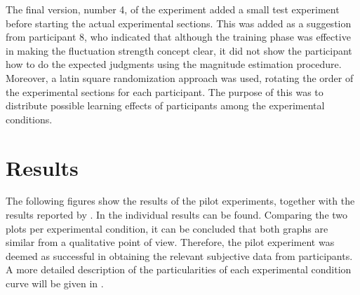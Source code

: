 \documentclass[../main.tex]{subfiles}
\begin{document}
The final version, number 4, of the experiment added a small test experiment
before starting the actual experimental sections. This was added as a suggestion
from participant 8, who indicated that although the training phase was effective
in making the fluctuation strength concept clear, it did not show the
participant how to do the expected judgments using the magnitude estimation
procedure. Moreover, a latin square randomization approach was used, rotating
the order of the experimental sections for each participant. The purpose of this
was to distribute possible learning effects of participants among the
experimental conditions.

\section{Results}

The following figures show the results of the pilot experiments, together with
the results reported by \textcite{Fastl2007Psychoacoustics}. In
 the individual results can be found.
Comparing the two plots per experimental condition, it can be concluded that
both graphs are similar from a qualitative point of view. Therefore, the pilot
experiment was deemed as successful in obtaining the relevant subjective data
from participants. A more detailed description of the particularities of each
experimental condition curve will be given in .
\end{document}
